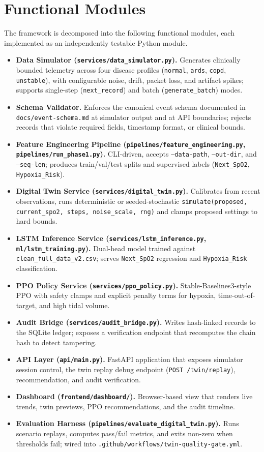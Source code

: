 \documentclass[12pt,a4paper,oneside]{report}
\begin{document}
\section{Functional Modules}
The framework is decomposed into the following functional modules, each implemented as an independently testable Python module.
\begin{itemize}[leftmargin=*]
  \item \textbf{Data Simulator (\texttt{services/data\_simulator.py}).} Generates clinically bounded telemetry across four disease profiles (\texttt{normal}, \texttt{ards}, \texttt{copd}, \texttt{unstable}), with configurable noise, drift, packet loss, and artifact spikes; supports single-step (\texttt{next\_record}) and batch (\texttt{generate\_batch}) modes.
  \item \textbf{Schema Validator.} Enforces the canonical event schema documented in \texttt{docs/event-schema.md} at simulator output and at API boundaries; rejects records that violate required fields, timestamp format, or clinical bounds.
  \item \textbf{Feature Engineering Pipeline (\texttt{pipelines/feature\_engineering.py}, \texttt{pipelines/run\_phase1.py}).} CLI-driven, accepts \texttt{--data-path}, \texttt{--out-dir}, and \texttt{--seq-len}; produces train/val/test splits and supervised labels (\texttt{Next\_SpO2}, \texttt{Hypoxia\_Risk}).
  \item \textbf{Digital Twin Service (\texttt{services/digital\_twin.py}).} Calibrates from recent observations, runs deterministic or seeded-stochastic \texttt{simulate(proposed, current\_spo2, steps, noise\_scale, rng)} and clamps proposed settings to hard bounds.
  \item \textbf{LSTM Inference Service (\texttt{services/lstm\_inference.py}, \texttt{ml/lstm\_training.py}).} Dual-head model trained against \texttt{clean\_full\_data\_v2.csv}; serves \texttt{Next\_SpO2} regression and \texttt{Hypoxia\_Risk} classification.
  \item \textbf{PPO Policy Service (\texttt{services/ppo\_policy.py}).} Stable-Baselines3-style PPO with safety clamps and explicit penalty terms for hypoxia, time-out-of-target, and high tidal volume.
  \item \textbf{Audit Bridge (\texttt{services/audit\_bridge.py}).} Writes hash-linked records to the SQLite ledger; exposes a verification endpoint that recomputes the chain hash to detect tampering.
  \item \textbf{API Layer (\texttt{api/main.py}).} FastAPI application that exposes simulator session control, the twin replay debug endpoint (\texttt{POST /twin/replay}), recommendation, and audit verification.
  \item \textbf{Dashboard (\texttt{frontend/dashboard/}).} Browser-based view that renders live trends, twin previews, PPO recommendations, and the audit timeline.
  \item \textbf{Evaluation Harness (\texttt{pipelines/evaluate\_digital\_twin.py}).} Runs scenario replays, computes pass/fail metrics, and exits non-zero when thresholds fail; wired into \texttt{.github/workflows/twin-quality-gate.yml}.
\end{itemize}
\end{document}
